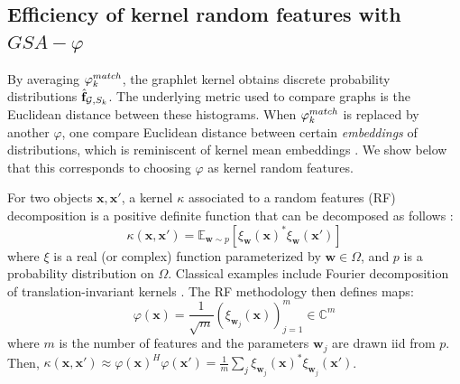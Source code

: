 \documentclass{article}
\begin{document}
\subsection{Efficiency of kernel random features with $GSA-\varphi$} 
\label{sec:MMD}

By averaging $\varphi^{match}_k$, the graphlet kernel obtains discrete probability distributions $\hat{\mathbf{f}}_{\mathcal{G}, S_k}$. The underlying metric used to compare graphs is the Euclidean distance between these histograms. When $\varphi^{match}_k$ is replaced by another $\varphi$, one compare Euclidean distance between certain \emph{embeddings} of distributions, which is reminiscent of kernel mean embeddings \cite{gretton}. We show below that this corresponds to choosing $\varphi$ as kernel random features.

For two objects $\mathbf{x}, \mathbf{x'}$, a kernel $\kappa$ associated to a random features (RF) decomposition is a positive definite function that can be decomposed  as follows \cite{rahimi2008random}:
\begin{equation}
\label{eq:RF_decomposition}
\kappa(\mathbf{x},\mathbf{x}')=\mathbb{E}_{\mathbf{w}\sim p}[ \xi_\mathbf{w}(\mathbf{x})^* \xi_\mathbf{w}(\mathbf{x}')]
\end{equation}
where $\xi$ is a real (or complex) function parameterized by $\mathbf{w} \in \Omega$, and $p$ is a probability distribution on $\Omega$. Classical examples include Fourier decomposition of translation-invariant kernels \cite{rahimi2008random}.
The RF methodology then defines maps:
\begin{equation}
	\label{eq:def_RF}
	\varphi(\mathbf{x}) = \frac{1}{\sqrt{m}} ( \xi_{\mathbf{w}_j}(\mathbf{x}) )_{j=1}^m \in \mathbb{C}^m
\end{equation}
where $m$ is the number of features and the parameters $\mathbf{w}_j$ are drawn iid from $p$. Then, $\kappa(\mathbf{x},\mathbf{x}')\approx	\varphi(\mathbf{x})^H	\varphi(\mathbf{x}') = \frac{1}{m} \sum_j \xi_{\mathbf{w}_j}(\mathbf{x})^* \xi_{\mathbf{w}_j}(\mathbf{x}')$.
\end{document}
